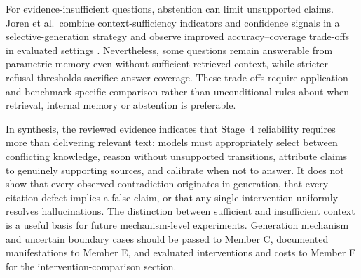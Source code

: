 For evidence-insufficient questions, abstention can limit unsupported claims. Joren et al.\ combine context-sufficiency indicators and confidence signals in a selective-generation strategy and observe improved accuracy--coverage trade-offs in evaluated settings \cite[Sec.~5]{joren2025sufficient}. Nevertheless, some questions remain answerable from parametric memory even without sufficient retrieved context, while stricter refusal thresholds sacrifice answer coverage. These trade-offs require application- and benchmark-specific comparison rather than unconditional rules about when retrieval, internal memory or abstention is preferable.

In synthesis, the reviewed evidence indicates that Stage~4 reliability requires more than delivering relevant text: models must appropriately select between conflicting knowledge, reason without unsupported transitions, attribute claims to genuinely supporting sources, and calibrate when not to answer. It does not show that every observed contradiction originates in generation, that every citation defect implies a false claim, or that any single intervention uniformly resolves hallucinations. The distinction between sufficient and insufficient context is a useful basis for future mechanism-level experiments. Generation mechanism and uncertain boundary cases should be passed to Member C, documented manifestations to Member E, and evaluated interventions and costs to Member F for the intervention-comparison section.
